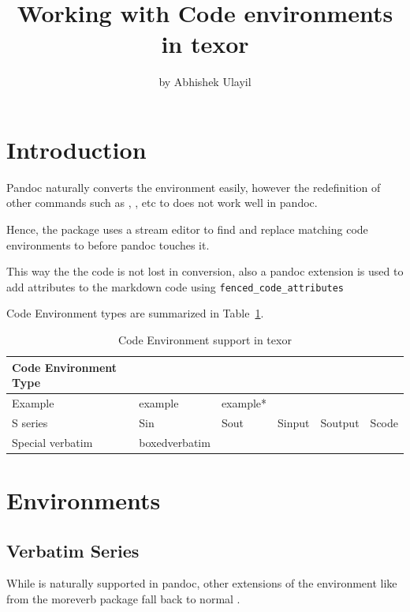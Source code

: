 \title{Working with Code environments in texor}
\author{by Abhishek Ulayil}

\maketitle


\section{Introduction}

Pandoc naturally converts the  environment easily, however the redefinition of other commands such as , ,  etc to  does not work well in pandoc.

Hence, the  package uses a stream editor to find and replace matching code environments to  before pandoc touches it.

This way the the code is not lost in conversion, also a pandoc extension is used to add attributes to the markdown code using  \verb|fenced_code_attributes|

Code Environment types are summarized in Table~\ref{table:1}.

\begin{table}[htbp]
\centering
\begin{tabular}{l | lllll }
 \hline
 Code Environment Type &  &  &  & & \\
 \hline
 Example          & example & example* &  & & \\
 S series         & Sin & Sout & Sinput & Soutput & Scode \\
 Special verbatim & boxedverbatim & &  & & \\
\hline
\end{tabular}
\caption{Code Environment support in texor}
\label{table:1}
\end{table}


\section{Environments}

\subsection{Verbatim Series}
While  is naturally supported in pandoc, other extensions of the  environment
like  from the moreverb package \citep{moreverb} fall back to normal .

